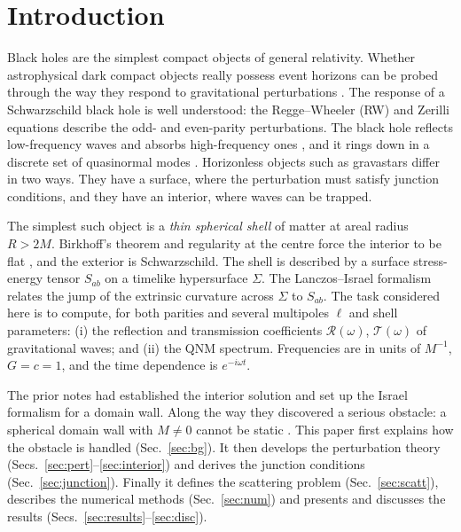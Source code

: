 \documentclass[11pt,a4paper]{article}
\numberwithin{equation}{section}
\newcommand{\RR}{\mathcal R}
\newcommand{\TT}{\mathcal T}
\begin{document}
\section{Introduction}\label{sec:intro}
Black holes are the simplest compact objects of general relativity. Whether astrophysical dark compact objects
really possess event horizons can be probed through the way they respond to gravitational perturbations
\cite{CardosoPani2019,Cardoso2016PRL,Cardoso2016PRD,Abedi2017}. The response of a Schwarzschild black hole is well
understood: the Regge--Wheeler (RW) \cite{RW57} and Zerilli \cite{Zerilli70} equations describe the odd- and
even-parity perturbations. The black hole reflects low-frequency waves and absorbs high-frequency ones
\cite{Vishveshwara70}, and it rings down in a discrete set of quasinormal modes
\cite{Leaver85,KokkotasSchmidt99,Nollert99,BCS09,KonoplyaZhidenko11}. Horizonless objects such as gravastars
\cite{MazurMottola04,VisserWiltshire04,ChirentiRezzolla07,Pani09} differ in two ways. They have a surface, where the
perturbation must satisfy junction conditions, and they have an interior, where waves can be trapped.

The simplest such object is a \emph{thin spherical shell} of matter at areal radius $R>2M$. Birkhoff's theorem and
regularity at the centre force the interior to be flat \cite{ondas}, and the exterior is Schwarzschild. The shell is
described by a surface stress-energy tensor $S_{ab}$ on a timelike hypersurface $\Sigma$. The Lanczos--Israel
formalism \cite{Lanczos24,Israel66,Poisson04,IS84} relates the jump of the extrinsic curvature across $\Sigma$ to
$S_{ab}$. The task considered here is to compute, for both parities and several multipoles $\ell$ and shell
parameters:
(i) the reflection and transmission coefficients $\RR(\omega)$, $\TT(\omega)$ of gravitational waves; and
(ii) the QNM spectrum.
Frequencies are in units of $M^{-1}$, $G=c=1$, and the time dependence is $e^{-i\omega t}$.

The prior notes \cite{ondas,burbuja} had established the interior solution and set up the Israel formalism for a
domain wall. Along the way they discovered a serious obstacle: a spherical domain wall with $M\ne0$ cannot be
static \cite{IS84}. This paper first explains how the obstacle is handled (Sec.~\ref{sec:bg}). It then develops
the perturbation theory (Secs.~\ref{sec:pert}--\ref{sec:interior}) and derives the junction conditions
(Sec.~\ref{sec:junction}). Finally it defines the scattering problem (Sec.~\ref{sec:scatt}), describes the
numerical methods (Sec.~\ref{sec:num}) and presents and discusses the results
(Secs.~\ref{sec:results}--\ref{sec:disc}).
\end{document}
